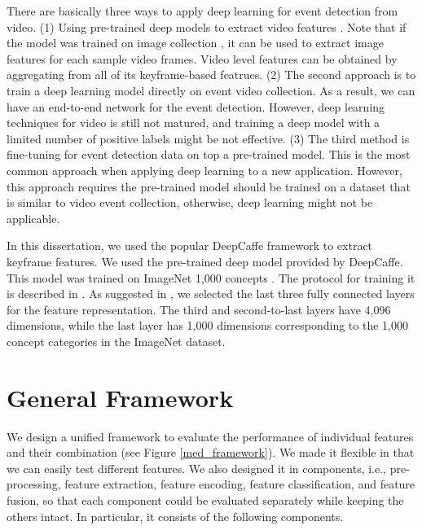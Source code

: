 There are basically three ways to apply deep learning for event detection from video. (1)
Using pre-trained deep models to extract video features \cite{tran2014c3d}. Note that if the model was trained on image collection \cite{krizhevsky2012imagenet,chatfield2014return,simonyan2014very,zhou2014learning}, it can be used to extract image features for each sample video frames. Video level features can be obtained by aggregating from all of its keyframe-based featrues. (2) The second approach is to train a deep learning model directly on event video collection. As a result, we can have an end-to-end network for the event detection. However, deep learning techniques for video is still not matured, and training a deep model with a limited number of positive labels might be not effective. (3) The third method is fine-tuning for event detection data on top a pre-trained model. This is the most common approach when applying deep learning to a new application. However, this approach requires the pre-trained model should be trained on a dataset that is similar to video event collection, otherwise, deep learning might not be applicable.
 
In this dissertation, we used the popular DeepCaffe \cite{jia2014caffe} framework to extract keyframe features. We used the pre-trained deep model provided by DeepCaffe. This model was trained on ImageNet 1,000 concepts \cite{deng2009imagenet}. The protocol for training it is described in \cite{jia2014caffe}. As suggested in \cite{krizhevsky2012imagenet}, we selected the last three fully connected layers for the feature representation. The third and second-to-last layers have 4,096 dimensions, while the last layer has 1,000 dimensions corresponding to the 1,000 concept categories in the ImageNet dataset. 

\section{General Framework}

We design a unified framework to evaluate the performance of individual features and their combination (see Figure \ref{med_framework}). We made it flexible in that we can easily test different features. We also designed it in components, i.e., pre-processing, feature extraction, feature encoding, feature classification, and feature fusion, so that each component could be evaluated separately while keeping the others intact. In particular, it consists of the following components.

